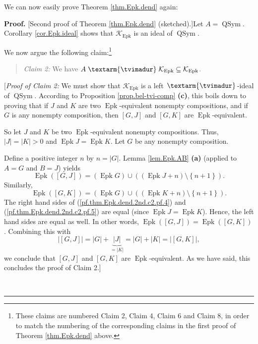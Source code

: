 \documentclass[numbers=enddot,12pt,final,onecolumn,notitlepage]{scrartcl}%
\theoremstyle{definition}
\newenvironment{statement}{\begin{quote}}{\end{quote}}
\newenvironment{proof}[1][Proof]{\noindent\textbf{#1.} }{\ \rule{0.5em}{0.5em}}
\newenvironment{verlong}{}{}
\newcommand{\tvi}{\left. \textarm{\tvimadur} \right.}
\begin{document}
\begin{verlong}
We can now easily prove Theorem \ref{thm.Epk.dend} again:

\begin{proof}
[Second proof of Theorem \ref{thm.Epk.dend} (sketched).]Let
$A=\operatorname*{QSym}$. Corollary \ref{cor.Epk.ideal} shows that
$\mathcal{K}_{\operatorname{Epk}}$ is an ideal of $\operatorname*{QSym}$.

We now argue the following claim:\footnote{These claims are numbered Claim 2,
Claim 4, Claim 6 and Claim 8, in order to match the numbering of the
corresponding claims in the first proof of Theorem \ref{thm.Epk.dend} above.}

\begin{statement}
\textit{Claim 2:} We have $A\tvi\mathcal{K}_{\operatorname{Epk}}%
\subseteq\mathcal{K}_{\operatorname{Epk}}$.
\end{statement}

[\textit{Proof of Claim 2:} We must show that $\mathcal{K}%
_{\operatorname{Epk}}$ is a left $\tvi$-ideal of $\operatorname*{QSym}$.
According to Proposition \ref{prop.bel-tvi-comp} \textbf{(c)}, this boils down
to proving that if $J$ and $K$ are two $\operatorname{Epk}$-equivalent
nonempty compositions, and if $G$ is any nonempty composition, then $\left[
G,J\right]  $ and $\left[  G,K\right]  $ are $\operatorname{Epk}$-equivalent.

So let $J$ and $K$ be two $\operatorname{Epk}$-equivalent nonempty
compositions. Thus, $\left\vert J\right\vert =\left\vert K\right\vert >0$ and
$\operatorname{Epk}J=\operatorname{Epk}K$.
Let $G$ be any nonempty composition.

Define a positive integer $n$ by $n=\left\vert G\right\vert $. Lemma
\ref{lem.Epk.AB} \textbf{(a)} (applied to $A=G$ and $B=J$) yields
\begin{equation}
\operatorname{Epk}\left(  \left[  G,J\right]  \right)  =\left(
\operatorname{Epk}G\right)  \cup\left(  \left(  \operatorname{Epk}%
J+n\right)  \setminus\left\{  n+1\right\}  \right)  .
\label{pf.thm.Epk.dend.2nd.c2.pf.4}%
\end{equation}
Similarly,%
\begin{equation}
\operatorname{Epk}\left(  \left[  G,K\right]  \right)  =\left(
\operatorname{Epk}G\right)  \cup\left(  \left(  \operatorname{Epk}%
K+n\right)  \setminus\left\{  n+1\right\}  \right)  .
\label{pf.thm.Epk.dend.2nd.c2.pf.5}%
\end{equation}
The right hand sides of (\ref{pf.thm.Epk.dend.2nd.c2.pf.4}) and
(\ref{pf.thm.Epk.dend.2nd.c2.pf.5}) are equal (since $\operatorname{Epk}%
J=\operatorname{Epk}K$). Hence, the left hand sides are equal as well. In
other words, $\operatorname{Epk}\left(  \left[  G,J\right]  \right)
=\operatorname{Epk}\left(  \left[  G,K\right]  \right)  $. Combining this
with%
\[
\left\vert \left[  G,J\right]  \right\vert =\left\vert G\right\vert
+\underbrace{\left\vert J\right\vert }_{=\left\vert K\right\vert }=\left\vert
G\right\vert +\left\vert K\right\vert =\left\vert \left[  G,K\right]
\right\vert ,
\]
we conclude that $\left[  G,J\right]  $ and $\left[  G,K\right]  $ are
$\operatorname{Epk}$-equivalent. As we have said, this concludes the proof of
Claim 2.]


\end{proof}
\end{verlong}
\end{document}
